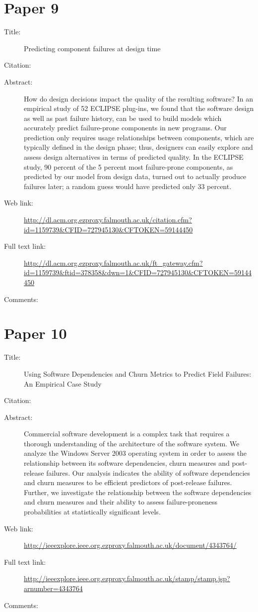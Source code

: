 \documentclass{scrartcl}
\begin{document}
\section*{Paper 9}
\begin{description}
\item[Title:] Predicting component failures at design time
\item[Citation:] \cite{schroter2006predicting}
\item[Abstract:] How do design decisions impact the quality of the resulting software? In an empirical study of 52 ECLIPSE plug-ins, we found that the software design as well as past failure history, can be used to build models which accurately predict failure-prone components in new programs. Our prediction only requires usage relationships between components, which are typically defined in the design phase; thus, designers can easily explore and assess design alternatives in terms of predicted quality. In the ECLIPSE study, 90 percent of the 5 percent most failure-prone components, as predicted by our model from design data, turned out to actually produce failures later; a random guess would have predicted only 33 percent.
\item[Web link:] \url {http://dl.acm.org.ezproxy.falmouth.ac.uk/citation.cfm?id=1159739&CFID=727945130&CFTOKEN=59144450}
\item[Full text link:]\url  {http://dl.acm.org.ezproxy.falmouth.ac.uk/ft_gateway.cfm?id=1159739&ftid=378358&dwn=1&CFID=727945130&CFTOKEN=59144450}
\item[Comments:] 
\end{description}

\section*{Paper 10}
\begin{description}
\item[Title:] Using Software Dependencies and Churn Metrics to Predict Field Failures: An Empirical Case Study
\item[Citation:] \cite{nagappan2007using}
\item[Abstract:] Commercial software development is a complex task that requires a thorough understanding of the architecture of the software system. We analyze the Windows Server 2003 operating system in order to assess the relationship between its software dependencies, churn measures and post-release failures. Our analysis indicates the ability of software dependencies and churn measures to be efficient predictors of post-release failures. Further, we investigate the relationship between the software dependencies and churn measures and their ability to assess failure-proneness probabilities at statistically significant levels.
\item[Web link:]\url  {http://ieeexplore.ieee.org.ezproxy.falmouth.ac.uk/document/4343764/}
\item[Full text link:]\url  {http://ieeexplore.ieee.org.ezproxy.falmouth.ac.uk/stamp/stamp.jsp?arnumber=4343764}
\item[Comments:] 
\end{description}



\end{document}
